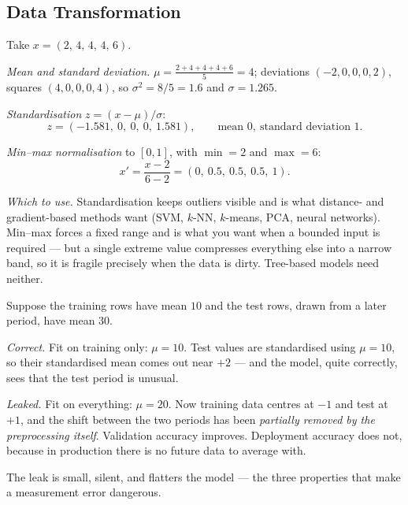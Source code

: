 \subsection{Data Transformation}

\begin{workedexample}
Take $x = (2,\,4,\,4,\,4,\,6)$.

\emph{Mean and standard deviation.}
$\mu = \frac{2+4+4+4+6}{5} = 4$;
deviations $(-2,0,0,0,2)$, squares $(4,0,0,0,4)$, so
$\sigma^2 = 8/5 = 1.6$ and $\sigma = 1.265$.

\emph{Standardisation} $z = (x-\mu)/\sigma$:
\[
  z = (-1.581,\ 0,\ 0,\ 0,\ 1.581),
  \qquad \text{mean } 0,\ \text{standard deviation } 1 .
\]

\emph{Min--max normalisation} to $[0,1]$, with $\min = 2$ and $\max = 6$:
\[
  x' = \frac{x-2}{6-2} = (0,\ 0.5,\ 0.5,\ 0.5,\ 1) .
\]

\emph{Which to use.} Standardisation keeps outliers visible and is what
distance- and gradient-based methods want (SVM, $k$-NN, $k$-means, PCA, neural
networks). Min--max forces a fixed range and is what you want when a bounded
input is required --- but a single extreme value compresses everything else
into a narrow band, so it is fragile precisely when the data is dirty.
Tree-based models need neither.
\end{workedexample}

\begin{workedexample}
Suppose the training rows have mean $10$ and the test rows, drawn from a later
period, have mean $30$.

\emph{Correct.} Fit on training only: $\mu = 10$. Test values are standardised
using $\mu = 10$, so their standardised mean comes out near $+2$ --- and the
model, quite correctly, sees that the test period is unusual.

\emph{Leaked.} Fit on everything: $\mu = 20$. Now training data centres at
$-1$ and test at $+1$, and the shift between the two periods has been
\emph{partially removed by the preprocessing itself}. Validation accuracy
improves. Deployment accuracy does not, because in production there is no
future data to average with.

The leak is small, silent, and flatters the model --- the three properties that
make a measurement error dangerous.
\end{workedexample}

